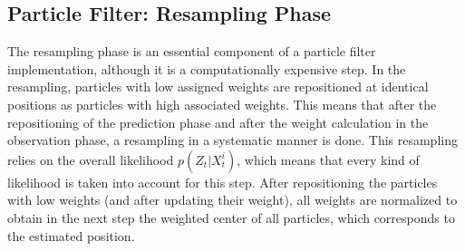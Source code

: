 \subsection{Particle Filter: Resampling Phase}
The resampling phase is an essential component of a particle filter implementation, although it is a computationally expensive step. In the resampling, particles with low assigned weights are repositioned at identical positions as particles with high associated weights. This means that after the repositioning of the prediction phase and after the weight calculation in the observation phase, a resampling in a systematic manner is done. This resampling relies on the overall likelihood $p(Z_{t} | X^{i}_{t})$, which means that every kind of likelihood is taken into account for this step. After repositioning the particles with low weights (and after updating their weight), all weights are normalized to obtain in the next step the weighted center of all particles, which corresponds to the estimated position. 



